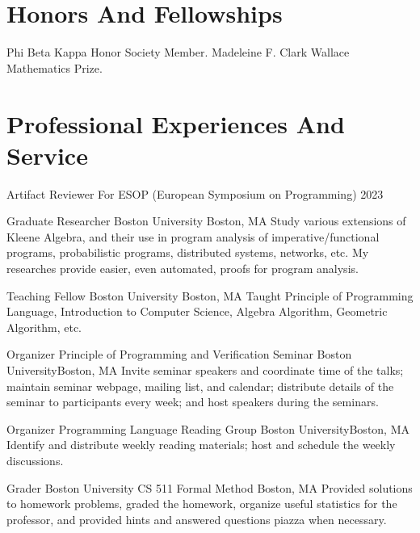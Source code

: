 \documentclass[11pt,roman]{moderncv}        %
\begin{document}
 
\section{Honors And Fellowships}
 {Phi Beta Kappa Honor Society Member.}
 {Madeleine F. Clark Wallace Mathematics Prize.}


\section{Professional Experiences And Service}

{Artifact Reviewer For ESOP (European Symposium on Programming) 2023}
{}{}{}{}

{Graduate Researcher}
{Boston University}
{Boston, MA}{}
{Study various extensions of Kleene Algebra, and their use in program analysis
of imperative/functional programs, probabilistic programs, distributed systems, networks, etc.
My researches provide easier, even automated, proofs for program analysis.
}

{Teaching Fellow}
{Boston University}
{Boston, MA}{}
{
  Taught Principle of Programming Language, Introduction to Computer Science,
  Algebra Algorithm, Geometric Algorithm, etc.
}


{Organizer}
{Principle of Programming and Verification Seminar}
{Boston University}{Boston, MA}
{Invite seminar speakers and coordinate time of the talks;
maintain seminar webpage, mailing list, and calendar;
distribute details of the seminar to participants every week;
and host speakers during the seminars.}

{Organizer}
{Programming Language Reading Group}
{Boston University}{Boston, MA}
{Identify and distribute weekly reading materials;
host and schedule the weekly discussions.}

{Grader}
{Boston University CS 511 Formal Method}
{Boston, MA}{}
{Provided solutions to homework problems, graded the homework,
organize useful statistics for the professor, 
and provided hints and answered questions piazza when necessary.}
\end{document}
